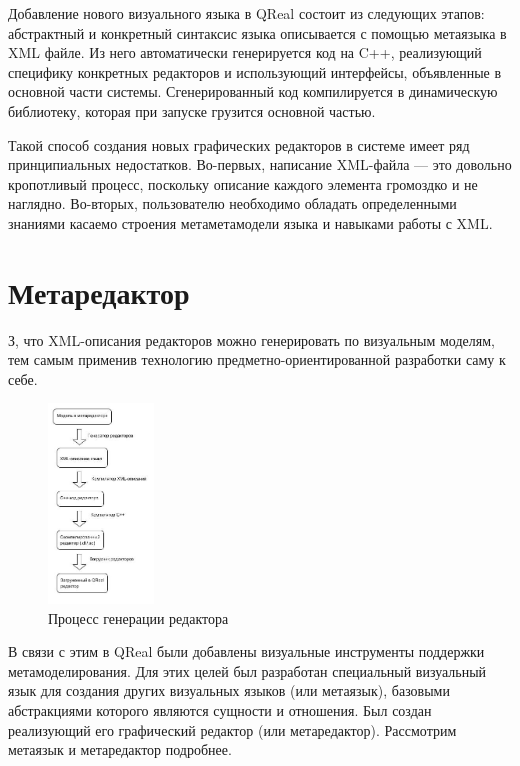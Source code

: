 \documentclass[a4paper]{article}
\begin{document}
Добавление нового визуального языка в QReal состоит из следующих этапов: абстрактный и конкретный синтаксис языка описывается с помощью метаязыка в XML файле. Из него автоматически генерируется код на C++, реализующий специфику конкретных редакторов и использующий интерфейсы, объявленные в основной части системы. Сгенерированный код компилируется в динамическую библиотеку, которая при запуске грузится основной частью.

Такой способ создания новых графических редакторов в системе имеет ряд принципиальных недостатков. Во-первых, написание XML-файла --- это довольно кропотливый процесс, поскольку описание каждого элемента громоздко и не наглядно. Во-вторых, пользователю необходимо обладать определенными знаниями касаемо строения метаметамодели языка и навыками работы с XML.

\section{Метаредактор}

З, что XML-описания редакторов можно генерировать по визуальным моделям, тем самым применив технологию предметно-ориентированной разработки саму к себе.

\begin{figure}[ht]
  \begin{center}
    \includegraphics[width=0.25\textwidth]{editorGeneration.jpg}
    \caption{Процесс генерации редактора}
    \label{editorGeneration}
  \end{center}
\end{figure}

В связи с этим в QReal были добавлены визуальные инструменты поддержки метамоделирования. Для этих целей был разработан специальный визуальный язык для создания других визуальных языков (или метаязык), базовыми абстракциями которого являются сущности и отношения. Был создан реализующий его графический редактор (или метаредактор). Рассмотрим метаязык и метаредактор подробнее. 
\end{document}
